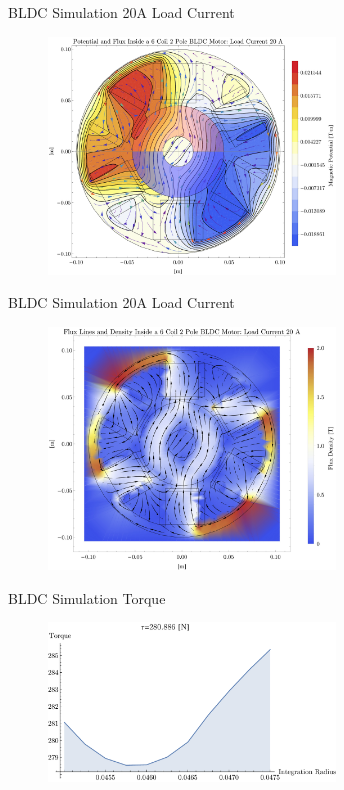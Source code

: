 \documentclass{beamer}
\begin{document}
    \begin{frame}{BLDC Simulation}
        20A Load Current
        \begin{figure}
            \centering
            \includegraphics[width=3in]{potential-loaded-6coils.pdf}
            \label{fig:my_label}
        \end{figure}
    \end{frame}
    
    \begin{frame}{BLDC Simulation}
        20A Load Current
        \begin{figure}
            \centering
            \includegraphics[width=3in]{flux-loaded-6coils.jpg}
            \label{fig:my_label}
        \end{figure}
    \end{frame}
    
    \begin{frame}{BLDC Simulation}
        Torque 
        \begin{figure}
            \centering
            \includegraphics[width=3in]{torque1.pdf}
            \label{fig:my_label}
        \end{figure}
    \end{frame}
    
\end{document}
